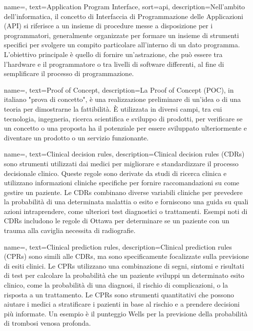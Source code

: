  {
    name=,
    text=Application Program Interface,
    sort=api,
    description={Nell'ambito dell'informatica, il concetto di Interfaccia di Programmazione delle Applicazioni (API) si riferisce a un insieme di procedure messe a disposizione per i programmatori, generalmente organizzate per formare un insieme di strumenti specifici per svolgere un compito particolare all'interno di un dato programma. L'obiettivo principale è quello di fornire un'astrazione, che può essere tra l'hardware e il programmatore o tra livelli di software differenti, al fine di semplificare il processo di programmazione.}
}

 {
    name=,
    text=Proof of Concept,
    description={La Proof of Concept (POC), in italiano "prova di concetto", è una realizzazione preliminare di un'idea o di una teoria per dimostrarne la fattibilità. È utilizzata in diversi campi, tra cui tecnologia, ingegneria, ricerca scientifica e sviluppo di prodotti, per verificare se un concetto o una proposta ha il potenziale per essere sviluppato ulteriormente e diventare un prodotto o un servizio funzionante.}
}

 {
    name=,
    text=Clinical decision rules,
    description={Clinical decision rules (CDRs) sono strumenti utilizzati dai medici per migliorare e standardizzare il processo decisionale clinico. Queste regole sono derivate da studi di ricerca clinica e utilizzano informazioni cliniche specifiche per fornire raccomandazioni su come gestire un paziente. Le CDRs combinano diverse variabili cliniche per prevedere la probabilità di una determinata malattia o esito e forniscono una guida su quali azioni intraprendere, come ulteriori test diagnostici o trattamenti. Esempi noti di CDRs includono le regole di Ottawa per determinare se un paziente con un trauma alla caviglia necessita di radiografie.}
}

 {
    name=,
    text=Clinical prediction rules,
    description={Clinical prediction rules (CPRs) sono simili alle CDRs, ma sono specificamente focalizzate sulla previsione di esiti clinici. Le CPRs utilizzano una combinazione di segni, sintomi e risultati di test per calcolare la probabilità che un paziente sviluppi un determinato esito clinico, come la probabilità di una diagnosi, il rischio di complicazioni, o la risposta a un trattamento. Le CPRs sono strumenti quantitativi che possono aiutare i medici a stratificare i pazienti in base al rischio e a prendere decisioni più informate. Un esempio è il punteggio Wells per la previsione della probabilità di trombosi venosa profonda.}
}


